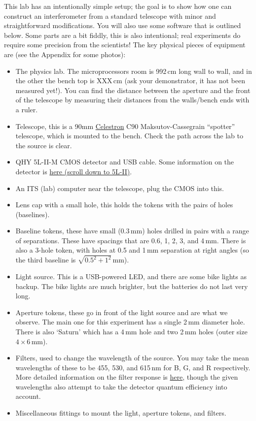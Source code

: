 \documentclass[11pt]{article}
\begin{document}
This lab has an intentionally simple setup; the goal is to show how one can construct an interferometer from a standard telescope with minor and straightforward modifications. You will also use some software that is outlined below. Some parts are a bit fiddly, this is also intentional; real experiments do require some precision from the scientists! The key physical pieces of equipment are (see the Appendix for some photos):
\begin{itemize}
    \item The physics lab. The microprocessors room is 992\,cm long wall to wall, and in the other the bench top is XXX\,cm (ask your demonstrator, it has not been measured yet!). You can find the distance between the aperture and the front of the telescope by measuring their distances from the walls/bench ends with a ruler.
    \item Telescope, this is a 90mm \href{https://www.celestron.com/products/c90-mak-spotting-scope#description}{Celestron} C90 Maksutov-Cassegrain ``spotter'' telescope, which is mounted to the bench. Check the path across the lab to the source is clear.
    \item QHY 5L-II-M CMOS detector and USB cable. Some information on the detector is \href{https://www.qhyccd.com/discontinued-products/}{here (scroll down to 5L-II)}.
    \item An ITS (lab) computer near the telescope, plug the CMOS into this.
    \item Lens cap with a small hole, this holds the tokens with the pairs of holes (baselines).
    \item Baseline tokens, these have small (0.3\,mm) holes drilled in pairs with a range of separations. These have spacings that are 0.6, 1, 2, 3, and 4\,mm. There is also a 3-hole token, with holes at 0.5 and 1\,mm separation at right angles (so the third baseline is $\sqrt{0.5^2 + 1^2}$\,mm).
    \item Light source. This is a USB-powered LED, and there are some bike lights as backup. The bike lights are much brighter, but the batteries do not last very long.
    \item Aperture tokens, these go in front of the light source and are what we observe. The main one for this experiment has a single 2\,mm diameter hole. There is also `Saturn' which has a 4\,mm hole and two 2\,mm holes (outer size $4 \times 6$\,mm).
    \item Filters, used to change the wavelength of the source. You may take the mean wavelengths of these to be 455, 530, and 615\,nm for B, G, and R respectively. More detailed information on the filter response is \href{https://www.firstlightoptics.com/rgb-filters-filter-sets/zwo-2-lrgb-filter-set.html}{here}, though the given wavelengths also attempt to take the detector quantum efficiency into account.
    \item Miscellaneous fittings to mount the light, aperture tokens, and filters.
\end{itemize}
\end{document}
